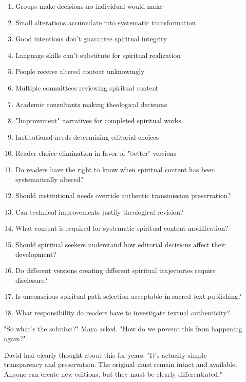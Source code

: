 \documentclass[12pt,twoside]{book}
\begin{document}
\begin{enumerate}
\item Groups make decisions no individual would make
\item Small alterations accumulate into systematic transformation
\item Good intentions don't guarantee spiritual integrity
\item Language skills can't substitute for spiritual realization
\item People receive altered content unknowingly

\item Multiple committees reviewing spiritual content
\item Academic consultants making theological decisions
\item "Improvement" narratives for completed spiritual works
\item Institutional needs determining editorial choices
\item Reader choice elimination in favor of "better" versions

\item Do readers have the right to know when spiritual content has been systematically altered?
\item Should institutional needs override authentic transmission preservation?
\item Can technical improvements justify theological revision?
\item What consent is required for systematic spiritual content modification?

\item Should spiritual seekers understand how editorial decisions affect their development?
\item Do different versions creating different spiritual trajectories require disclosure?
\item Is unconscious spiritual path selection acceptable in sacred text publishing?
\item What responsibility do readers have to investigate textual authenticity?
\end{enumerate}

"So what's the solution?" Maya asked. "How do we prevent this from happening again?"

David had clearly thought about this for years. "It's actually simple—transparency and preservation. The original must remain intact and available. Anyone can create new editions, but they must be clearly differentiated."
\end{document}
